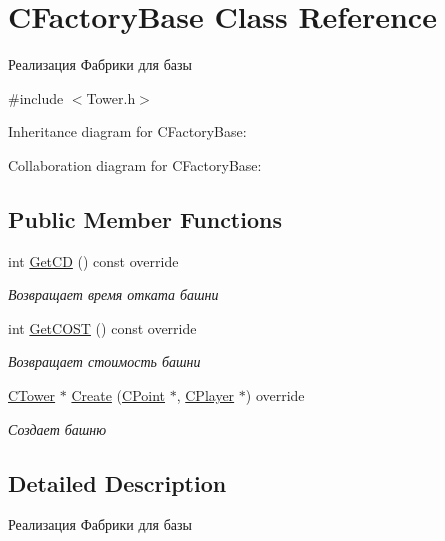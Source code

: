 \hypertarget{classCFactoryBase}{}\section{C\+Factory\+Base Class Reference}
\label{classCFactoryBase}


Реализация Фабрики для базы  




{\ttfamily \#include $<$Tower.\+h$>$}



Inheritance diagram for C\+Factory\+Base\+:


Collaboration diagram for C\+Factory\+Base\+:
\subsection*{Public Member Functions}
\begin{DoxyCompactItemize}
\item 
int \hyperlink{classCFactoryBase_accb9d962e33dd3125ebdad7cd8a98821}{Get\+CD} () const override\hypertarget{classCFactoryBase_accb9d962e33dd3125ebdad7cd8a98821}{}\label{classCFactoryBase_accb9d962e33dd3125ebdad7cd8a98821}

\begin{DoxyCompactList}\small\item\em Возвращает время отката башни \end{DoxyCompactList}\item 
int \hyperlink{classCFactoryBase_ae429a1a8a56b40f9f715786691f54f08}{Get\+C\+O\+ST} () const override\hypertarget{classCFactoryBase_ae429a1a8a56b40f9f715786691f54f08}{}\label{classCFactoryBase_ae429a1a8a56b40f9f715786691f54f08}

\begin{DoxyCompactList}\small\item\em Возвращает стоимость башни \end{DoxyCompactList}\item 
\hyperlink{classCTower}{C\+Tower} $\ast$ \hyperlink{classCFactoryBase_a68bef667673553a0857ab8dd5b360abb}{Create} (\hyperlink{classCPoint}{C\+Point} $\ast$, \hyperlink{classCPlayer}{C\+Player} $\ast$) override
\begin{DoxyCompactList}\small\item\em Создает башню \end{DoxyCompactList}\end{DoxyCompactItemize}


\subsection{Detailed Description}
Реализация Фабрики для базы 

